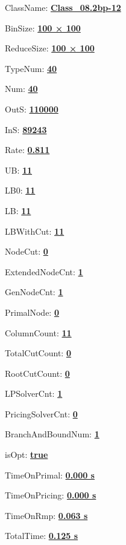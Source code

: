 \documentclass[11pt]{article}
\begin{document}
\pagestyle{empty}


ClassName: \underline{\textbf{Class_08.2bp-12}}
\par
BinSize: \underline{\textbf{100 × 100}}
\par
ReduceSize: \underline{\textbf{100 × 100}}
\par
TypeNum: \underline{\textbf{40}}
\par
Num: \underline{\textbf{40}}
\par
OutS: \underline{\textbf{110000}}
\par
InS: \underline{\textbf{89243}}
\par
Rate: \underline{\textbf{0.811}}
\par
UB: \underline{\textbf{11}}
\par
LB0: \underline{\textbf{11}}
\par
LB: \underline{\textbf{11}}
\par
LBWithCut: \underline{\textbf{11}}
\par
NodeCut: \underline{\textbf{0}}
\par
ExtendedNodeCnt: \underline{\textbf{1}}
\par
GenNodeCnt: \underline{\textbf{1}}
\par
PrimalNode: \underline{\textbf{0}}
\par
ColumnCount: \underline{\textbf{11}}
\par
TotalCutCount: \underline{\textbf{0}}
\par
RootCutCount: \underline{\textbf{0}}
\par
LPSolverCnt: \underline{\textbf{1}}
\par
PricingSolverCnt: \underline{\textbf{0}}
\par
BranchAndBoundNum: \underline{\textbf{1}}
\par
isOpt: \underline{\textbf{true}}
\par
TimeOnPrimal: \underline{\textbf{0.000 s}}
\par
TimeOnPricing: \underline{\textbf{0.000 s}}
\par
TimeOnRmp: \underline{\textbf{0.063 s}}
\par
TotalTime: \underline{\textbf{0.125 s}}
\par
\newpage


\end{document}
